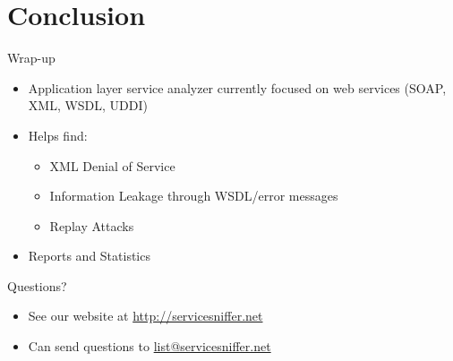 \documentclass{beamer}
\begin{document}
\section{Conclusion}

\begin{frame}{Wrap-up}
    \begin{itemize}
        \item Application layer service analyzer currently focused on web
            services (SOAP, XML, WSDL, UDDI)
        \item Helps find:
        \begin{itemize}
            \item XML Denial of Service
            \item Information Leakage through WSDL/error messages
            \item Replay Attacks
        \end{itemize}
        \item Reports and Statistics
    \end{itemize}
\end{frame}


\begin{frame}{Questions?}
    \begin{itemize}
        \item See our website at \url{http://servicesniffer.net}
        \item Can send questions to \url{list@servicesniffer.net}
    \end{itemize}
\end{frame}

\end{document}
